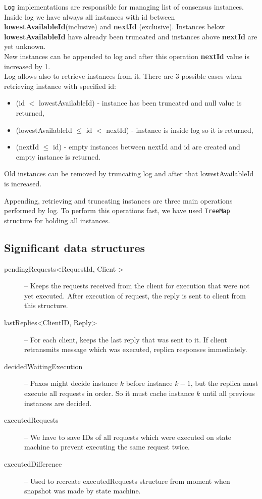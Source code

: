 \texttt{Log} implementations are responsible for managing list of consensus instances. Inside log we have always all instances with id between \textbf{lowestAvailableId}(inclusive) and \textbf{nextId} (exclusive). Instances below \textbf{lowestAvailableId} have already been truncated and instances above \textbf{nextId} are yet unknown. \\New instances can be appended to log and after this operation \textbf{nextId} value is increased by 1. \\Log allows also to retrieve instances from it. There are 3 possible cases when retrieving instance with specified id:
\begin{itemize}
  \item (id $<$ lowestAvailableId) - instance has been truncated and null value is returned,
  \item (lowestAvailableId $\leq$ id $<$ nextId) - instance is inside log so it is returned,
  \item (nextId $\leq$ id) - empty instances between nextId and id are created and empty instance is returned.
\end{itemize}
Old instances can be removed by truncating log and after that lowestAvailableId is increased. 

Appending, retrieving and truncating instances are three main operations performed by log. To perform this operations fast, we have used \texttt{TreeMap} structure for holding all instances.

\subsection{Significant data structures}
\label{subsubsec:significant_structures}
  \begin{description}
    \item[pendingRequests\textless RequestId, Client \textgreater] -- Keeps the requests received from the client for execution that were not yet executed. After execution of request, the reply is sent to client from this structure.
    \item[lastReplies\textless ClientID, Reply\textgreater] -- For each c\-li\-en\-t, keeps the last reply that was sent to it. If client retransmits message which was executed, replica responses immediately.
    \item[decidedWaitingExecution] -- Paxos might d\-e\-cide instance $k$ before instance $k-1$, but the replica must execute all requests in order. So it must cache instance $k$ until all previous instances are decided.
    \item[executedRequests] -- We have to save IDs of all requests which were executed on state machine to prevent executing the same request twice. 
	\item[executedDifference] -- Used to recreate executedRequests structure from moment when snapshot was made by state machine.
  \end{description}


